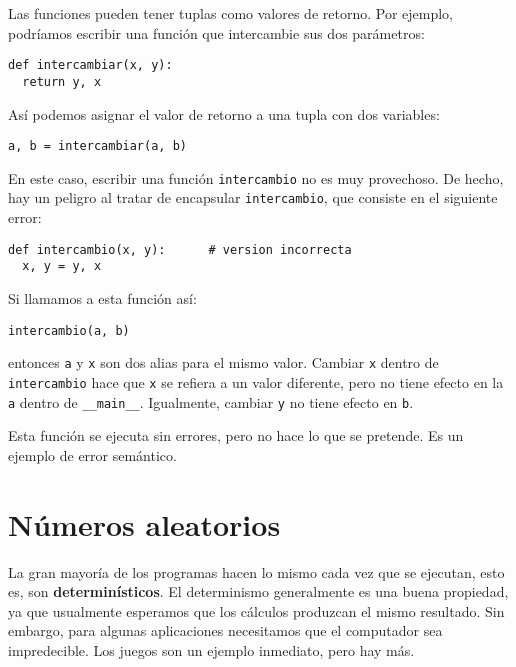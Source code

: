   

Las funciones pueden tener tuplas como valores de retorno. Por ejemplo,
podríamos escribir una función que intercambie sus dos parámetros:
\begin{lstlisting}
def intercambiar(x, y):
  return y, x
\end{lstlisting}
Así podemos asignar el valor de retorno a una tupla con dos variables:
\begin{lstlisting}
a, b = intercambiar(a, b)
\end{lstlisting}
En este caso, escribir una función \texttt{intercambio} no es muy
provechoso. De hecho, hay un peligro al tratar de encapsular \texttt{intercambio},
que consiste en el siguiente error:
\begin{lstlisting}
def intercambio(x, y):      # version incorrecta
  x, y = y, x
\end{lstlisting}
Si llamamos a esta función así:
\begin{lstlisting}
intercambio(a, b)
\end{lstlisting}
entonces \texttt{a} y \texttt{x} son dos alias para el mismo valor.
Cambiar \texttt{x} dentro de \texttt{intercambio} hace que \texttt{x}
se refiera a un valor diferente, pero no tiene efecto en la \texttt{a}
dentro de \texttt{\_\_main\_\_}. Igualmente, cambiar \texttt{y} no
tiene efecto en \texttt{b}.

Esta función se ejecuta sin errores, pero no hace lo que se pretende.
Es un ejemplo de error semántico.


\section{Números aleatorios}

 

La gran mayoría de los programas hacen lo mismo cada vez que se ejecutan,
esto es, son \textbf{determinísticos}. El determinismo generalmente
es una buena propiedad, ya que usualmente esperamos que los cálculos
produzcan el mismo resultado. Sin embargo, para algunas aplicaciones
necesitamos que el computador sea impredecible. Los juegos son un
ejemplo inmediato, pero hay más.

